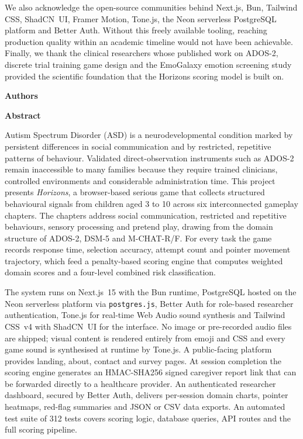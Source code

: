 \documentclass[12pt,a4paper,oneside]{report}
\newcommand{\fmheading}[1]{%
  \begin{center}
    {\fontsize{16}{24}\bfseries\selectfont #1}%
  \end{center}%
  \vspace{36pt}%
}
\begin{document}
We also acknowledge the open-source communities behind Next.js, Bun, Tailwind CSS, ShadCN~UI, Framer Motion, Tone.js, the Neon serverless PostgreSQL platform and Better Auth. Without this freely available tooling, reaching production quality within an academic timeline would not have been achievable. Finally, we thank the clinical researchers whose published work on ADOS-2, discrete trial training game design and the EmoGalaxy emotion screening study provided the scientific foundation that the Horizons scoring model is built on.

\vspace{18pt}
\begin{flushright}
  {\fontsize{12}{18}\bfseries\selectfont Authors}
\end{flushright}

\clearpage
{}
{}
\fmheading{Abstract}

Autism Spectrum Disorder (ASD) is a neurodevelopmental condition marked by persistent differences in social communication and by restricted, repetitive patterns of behaviour. Validated direct-observation instruments such as ADOS-2 remain inaccessible to many families because they require trained clinicians, controlled environments and considerable administration time. This project presents \textit{Horizons}, a browser-based serious game that collects structured behavioural signals from children aged 3 to 10 across six interconnected gameplay chapters. The chapters address social communication, restricted and repetitive behaviours, sensory processing and pretend play, drawing from the domain structure of ADOS-2, DSM-5 and M-CHAT-R/F. For every task the game records response time, selection accuracy, attempt count and pointer movement trajectory, which feed a penalty-based scoring engine that computes weighted domain scores and a four-level combined risk classification.

The system runs on Next.js~15 with the Bun runtime, PostgreSQL hosted on the Neon serverless platform via \texttt{postgres.js}, Better Auth for role-based researcher authentication, Tone.js for real-time Web Audio sound synthesis and Tailwind CSS~v4 with ShadCN~UI for the interface. No image or pre-recorded audio files are shipped; visual content is rendered entirely from emoji and CSS and every game sound is synthesised at runtime by Tone.js. A public-facing platform provides landing, about, contact and survey pages. At session completion the scoring engine generates an HMAC-SHA256 signed caregiver report link that can be forwarded directly to a healthcare provider. An authenticated researcher dashboard, secured by Better Auth, delivers per-session domain charts, pointer heatmaps, red-flag summaries and JSON or CSV data exports. An automated test suite of 312 tests covers scoring logic, database queries, API routes and the full scoring pipeline.
\end{document}
